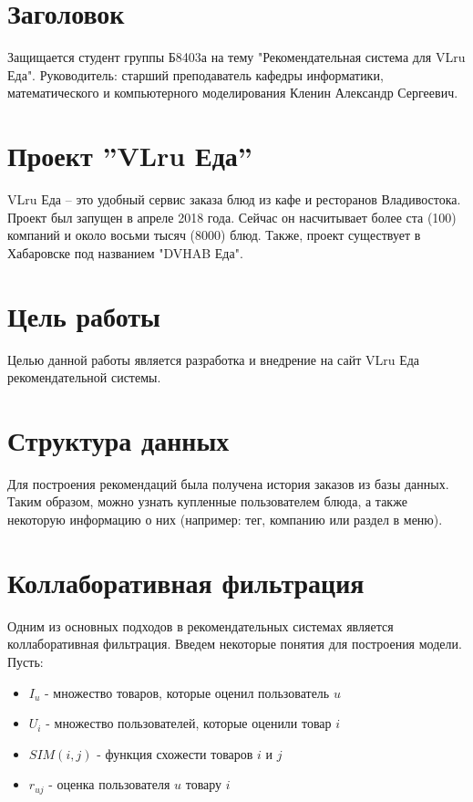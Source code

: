 \documentclass{fefu}
\begin{document}
  \section*{Заголовок}
  Защищается студент группы Б8403а на тему "Рекомендательная система для VLru Еда".
  Руководитель: старший преподаватель кафедры информатики, математического и компьютерного
  моделирования Кленин Александр Сергеевич.

  \section{Проект ”VLru Еда”}
  VLru Еда – это удобный сервис заказа блюд из кафе и ресторанов Владивостока.
  Проект был запущен в апреле 2018 года. Сейчас он насчитывает более ста (100) компаний
  и около восьми тысяч (8000) блюд. Также, проект существует в Хабаровске под
  названием "DVHAB Еда".

  \section{Цель работы}
  Целью данной работы является разработка и внедрение на сайт VLru Еда
  рекомендательной системы.

  \section{Структура данных}
  Для построения рекомендаций была получена история заказов из базы данных. Таким
  образом, можно узнать купленные пользователем блюда, а также некоторую информацию
  о них (например: тег, компанию или раздел в меню).

  \section{Коллаборативная фильтрация}
  Одним из основных подходов в рекомендательных системах является коллаборативная фильтрация.
  Введем некоторые понятия для построения модели. Пусть:
  \begin{itemize}
    \item $I_u$ - множество товаров, которые оценил пользователь $u$
    \item $U_i$ - множество пользователей, которые оценили товар $i$
    \item $SIM(i,j)$ - функция схожести товаров $i$ и $j$
    \item $r_{uj}$ - оценка пользователя $u$ товару $i$
  \end{itemize}
\end{document}

